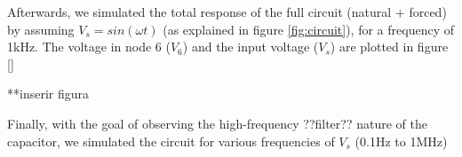 Afterwards, we simulated the total response of the full circuit (natural 
+ forced) by assuming $V_s = sin(\omega t)$ (as explained in figure \ref{fig:circuit}), 
for a frequency of 1kHz.
The voltage in node 6 ($V_6$) and the input voltage ($V_s$) are plotted 
in figure \ref{}

**inserir figura


Finally, with the goal of observing the high-frequency ??filter?? nature 
of the capacitor, we simulated the circuit for various frequencies of 
$V_s$ (0.1Hz to 1MHz)







